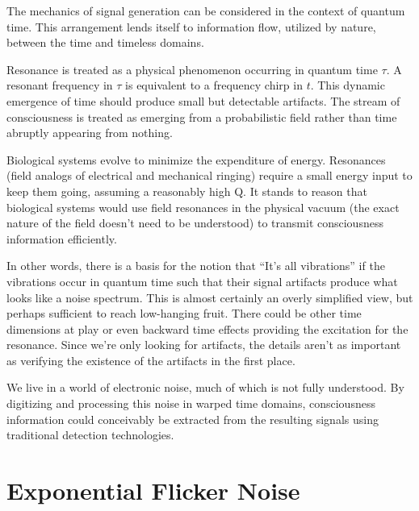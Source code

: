 The mechanics of signal generation can be considered in the context of
quantum time.
This arrangement lends itself to information flow, utilized by nature,
between the time and timeless domains.

Resonance is treated as a physical phenomenon occurring in quantum time $\tau$.
A resonant frequency in $\tau$ is equivalent to a frequency chirp in $t$.
This dynamic emergence of time should produce small but detectable artifacts.
The stream of consciousness is treated as emerging from a probabilistic field
rather than time abruptly appearing from nothing.

Biological systems evolve to minimize the expenditure of energy. Resonances
(field analogs of electrical and mechanical ringing) require a small energy
input to keep them going, assuming a reasonably high Q. It stands to reason
that biological systems would use field resonances in the physical vacuum
(the exact nature of the field doesn't need to be understood)
to transmit consciousness information efficiently.

In other words, there is a basis for the notion that ``It's all vibrations''
if the vibrations occur in quantum time such that their signal artifacts
produce what looks like a noise spectrum.
This is almost certainly an overly simplified view,
but perhaps sufficient to reach low-hanging fruit.
There could be other time dimensions at play or
even backward time effects providing the excitation for the resonance.
Since we're only looking for artifacts, the details aren't as important
as verifying the existence of the artifacts in the first place.

We live in a world of electronic noise, much of which is not fully understood.
By digitizing and processing this noise in warped time domains,
consciousness information could conceivably be extracted from the
resulting signals using traditional detection technologies.

\section{Exponential Flicker Noise}

